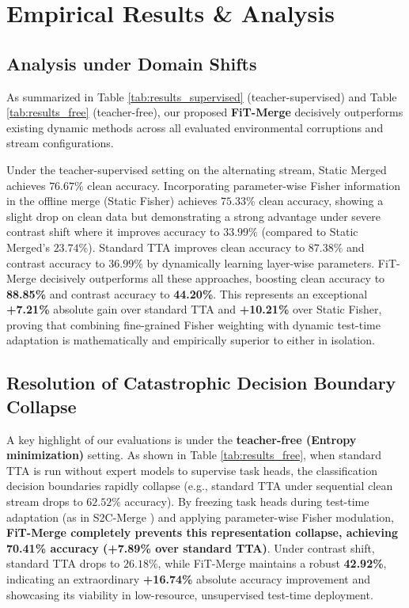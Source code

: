 \documentclass{article}
\theoremstyle{plain}
\theoremstyle{definition}
\theoremstyle{remark}
\begin{document}
\section{Empirical Results \& Analysis}
\label{sec:results}




\subsection{Analysis under Domain Shifts}
As summarized in Table \ref{tab:results_supervised} (teacher-supervised) and Table \ref{tab:results_free} (teacher-free), our proposed \textbf{FiT-Merge} decisively outperforms existing dynamic methods across all evaluated environmental corruptions and stream configurations.

Under the teacher-supervised setting on the alternating stream, Static Merged achieves $76.67\%$ clean accuracy. Incorporating parameter-wise Fisher information in the offline merge (Static Fisher) achieves $75.33\%$ clean accuracy, showing a slight drop on clean data but demonstrating a strong advantage under severe contrast shift where it improves accuracy to $33.99\%$ (compared to Static Merged's $23.74\%$). Standard TTA improves clean accuracy to $87.38\%$ and contrast accuracy to $36.99\%$ by dynamically learning layer-wise parameters. FiT-Merge decisively outperforms all these approaches, boosting clean accuracy to \textbf{88.85\%} and contrast accuracy to \textbf{44.20\%}. This represents an exceptional \textbf{+7.21\%} absolute gain over standard TTA and \textbf{+10.21\%} over Static Fisher, proving that combining fine-grained Fisher weighting with dynamic test-time adaptation is mathematically and empirically superior to either in isolation.

\subsection{Resolution of Catastrophic Decision Boundary Collapse}
A key highlight of our evaluations is under the \textbf{teacher-free (Entropy minimization)} setting. As shown in Table \ref{tab:results_free}, when standard TTA is run without expert models to supervise task heads, the classification decision boundaries rapidly collapse (e.g., standard TTA under sequential clean stream drops to $62.52\%$ accuracy). By freezing task heads during test-time adaptation (as in S2C-Merge \cite{s2cmerge}) and applying parameter-wise Fisher modulation, \textbf{FiT-Merge completely prevents this representation collapse, achieving 70.41\% accuracy (+7.89\% over standard TTA)}. Under contrast shift, standard TTA drops to $26.18\%$, while FiT-Merge maintains a robust \textbf{42.92\%}, indicating an extraordinary \textbf{+16.74\%} absolute accuracy improvement and showcasing its viability in low-resource, unsupervised test-time deployment.
\end{document}
